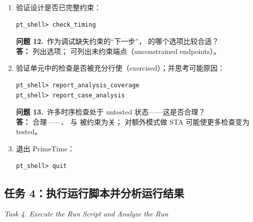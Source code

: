 \begin{enumerate}
\begin{questionBox}
\textbf{问题 11.}\ 作为调试缺失网的“下一步”， 的哪个选项比较合适？\\[0.35em]
\textbf{答：}  可列出选项；
 可列出网名；
若关注 pin-to-pin 网，可使用 。
\end{questionBox}

  \item 验证设计是否已完整约束：
\begin{lstlisting}
pt_shell> check_timing
\end{lstlisting}

\begin{questionBox}
\textbf{问题 12.}\ 作为调试缺失约束的“下一步”， 的哪个选项比较合适？\\[0.35em]
\textbf{答：}  列出选项； 可列出未约束端点（unconstrained endpoints）。
\end{questionBox}

  \item 验证单元中的检查是否被充分行使（exercised）；并思考可能原因：
\begin{lstlisting}
pt_shell> report_analysis_coverage
pt_shell> report_case_analysis
\end{lstlisting}

\begin{questionBox}
\textbf{问题 13.}\ 许多时序检查处于 untested 状态——这是否合理？\\[0.35em]
\textbf{答：} 合理——、 与  被约束为关；
对额外模式做 STA 可能使更多检查变为 tested。
\end{questionBox}

  \item 退出 PrimeTime：
\begin{lstlisting}
pt_shell> quit
\end{lstlisting}
\end{enumerate}

\subsection{任务 4：执行运行脚本并分析运行结果}
\label{lab1:task4}

\noindent\textit{Task 4. Execute the Run Script and Analyze the Run}

